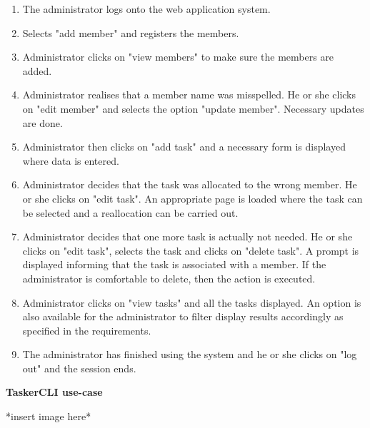 \documentclass{project}
\begin{document}
\begin{enumerate}
	\item The administrator logs onto the web application system.
	\item Selects "add member" and registers the members.
	\item Administrator clicks on "view members" to make sure the members are added.
	\item Administrator realises that a member name was misspelled. He or she clicks on "edit member" and selects the option "update member".  Necessary updates are done.
	\item Administrator then clicks on "add task" and a necessary form is displayed where data is entered.
	\item Administrator decides that the task was allocated to the wrong member.  He or she clicks on "edit task".  An appropriate page is loaded where the task can be selected and a reallocation can be carried out.
	\item Administrator decides that one more task is actually not needed.  He or she clicks on "edit task", selects the task and clicks on "delete task".  A prompt is displayed informing that the task is associated with a member.  If the administrator is comfortable to delete, then the action is executed.
	\item Administrator clicks on "view tasks" and all the tasks displayed.  An option is also available for the administrator to filter display results accordingly as specified in the requirements.
	\item The administrator has finished using the system and he or she clicks on "log out" and the session ends.
\end{enumerate} 
\textbf{TaskerCLI use-case}

*insert image here* 
\end{document}
